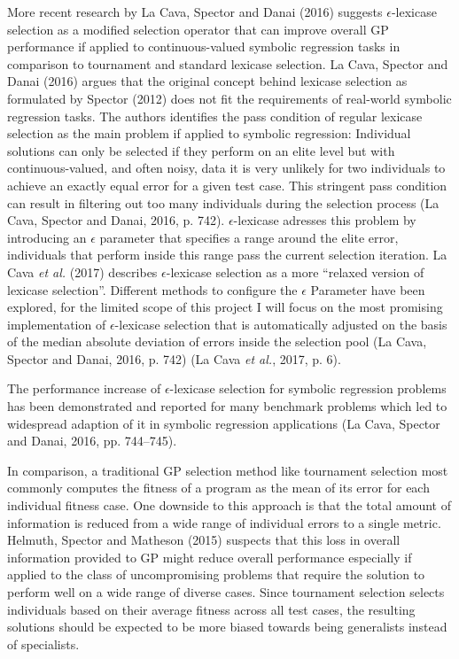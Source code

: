 \documentclass[
  12pt,
]{article}
\begin{document}
More recent research by La Cava, Spector and Danai (2016) suggests
\(\epsilon\)-lexicase selection as a modified selection operator that
can improve overall GP performance if applied to continuous-valued
symbolic regression tasks in comparison to tournament and standard
lexicase selection. La Cava, Spector and Danai (2016) argues that the
original concept behind lexicase selection as formulated by Spector
(2012) does not fit the requirements of real-world symbolic regression
tasks. The authors identifies the pass condition of regular lexicase
selection as the main problem if applied to symbolic regression:
Individual solutions can only be selected if they perform on an elite
level but with continuous-valued, and often noisy, data it is very
unlikely for two individuals to achieve an exactly equal error for a
given test case. This stringent pass condition can result in filtering
out too many individuals during the selection process (La Cava, Spector
and Danai, 2016, p. 742). \(\epsilon\)-lexicase adresses this problem by
introducing an \(\epsilon\) parameter that specifies a range around the
elite error, individuals that perform inside this range pass the current
selection iteration. La Cava \emph{et al.} (2017) describes
\(\epsilon\)-lexicase selection as a more ``relaxed version of lexicase
selection''. Different methods to configure the \(\epsilon\) Parameter
have been explored, for the limited scope of this project I will focus
on the most promising implementation of \(\epsilon\)-lexicase selection
that is automatically adjusted on the basis of the median absolute
deviation of errors inside the selection pool (La Cava, Spector and
Danai, 2016, p. 742) (La Cava \emph{et al.}, 2017, p. 6).

The performance increase of \(\epsilon\)-lexicase selection for symbolic
regression problems has been demonstrated and reported for many
benchmark problems which led to widespread adaption of it in symbolic
regression applications (La Cava, Spector and Danai, 2016, pp.
744--745).

In comparison, a traditional GP selection method like tournament
selection most commonly computes the fitness of a program as the mean of
its error for each individual fitness case. One downside to this
approach is that the total amount of information is reduced from a wide
range of individual errors to a single metric. Helmuth, Spector and
Matheson (2015) suspects that this loss in overall information provided
to GP might reduce overall performance especially if applied to the
class of uncompromising problems that require the solution to perform
well on a wide range of diverse cases. Since tournament selection
selects individuals based on their average fitness across all test
cases, the resulting solutions should be expected to be more biased
towards being generalists instead of specialists.
\end{document}
